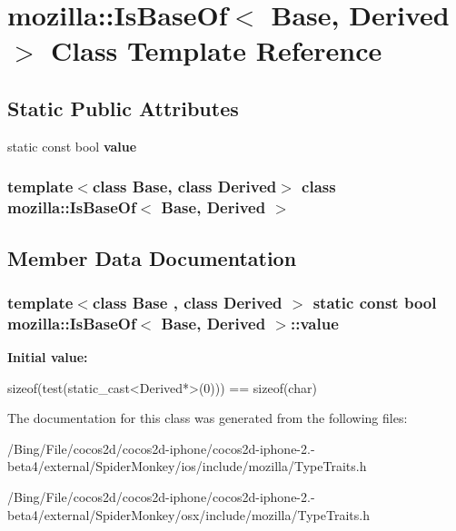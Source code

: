 \hypertarget{classmozilla_1_1_is_base_of}{\section{mozilla\-:\-:Is\-Base\-Of$<$ Base, Derived $>$ Class Template Reference}
\label{classmozilla_1_1_is_base_of}
}
\subsection*{Static Public Attributes}
\begin{DoxyCompactItemize}
\item 
static const bool {\bfseries value}
\end{DoxyCompactItemize}
\subsubsection*{template$<$class Base, class Derived$>$ class mozilla\-::\-Is\-Base\-Of$<$ Base, Derived $>$}



\subsection{Member Data Documentation}
\hypertarget{classmozilla_1_1_is_base_of_ab90f76c1dd46f3220fba9f04f5495300}{
\subsubsection[{value}]{\setlength{\rightskip}{0pt plus 5cm}template$<$class Base , class Derived $>$ static const bool {\bf mozilla\-::\-Is\-Base\-Of}$<$ Base, Derived $>$\-::value}}\label{classmozilla_1_1_is_base_of_ab90f76c1dd46f3220fba9f04f5495300}
{\bfseries Initial value\-:}
\begin{DoxyCode}

      sizeof(test(static_cast<Derived*>(0))) == sizeof(char)
\end{DoxyCode}


The documentation for this class was generated from the following files\-:\begin{DoxyCompactItemize}
\item 
/\-Bing/\-File/cocos2d/cocos2d-\/iphone/cocos2d-\/iphone-\/2.-\/beta4/external/\-Spider\-Monkey/ios/include/mozilla/Type\-Traits.\-h\item 
/\-Bing/\-File/cocos2d/cocos2d-\/iphone/cocos2d-\/iphone-\/2.-\/beta4/external/\-Spider\-Monkey/osx/include/mozilla/Type\-Traits.\-h\end{DoxyCompactItemize}
